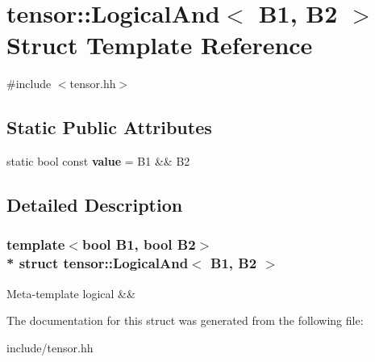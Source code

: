 \hypertarget{structtensor_1_1LogicalAnd}{}\section{tensor\+:\+:Logical\+And$<$ B1, B2 $>$ Struct Template Reference}
\label{structtensor_1_1LogicalAnd}


{\ttfamily \#include $<$tensor.\+hh$>$}

\subsection*{Static Public Attributes}
\begin{DoxyCompactItemize}
\item 
static bool const {\bfseries value} = B1 \&\& B2\hypertarget{structtensor_1_1LogicalAnd_a91622c00b662061e7baa7ddc1b999527}{}\label{structtensor_1_1LogicalAnd_a91622c00b662061e7baa7ddc1b999527}

\end{DoxyCompactItemize}


\subsection{Detailed Description}
\subsubsection*{template$<$bool B1, bool B2$>$\\*
struct tensor\+::\+Logical\+And$<$ B1, B2 $>$}

Meta-\/template logical \&\& 

The documentation for this struct was generated from the following file\+:\begin{DoxyCompactItemize}
\item 
include/tensor.\+hh\end{DoxyCompactItemize}

